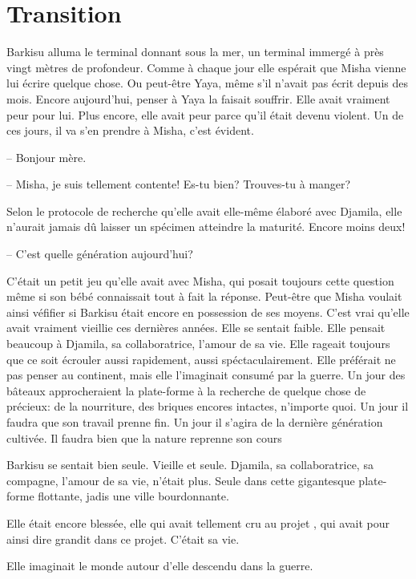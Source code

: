 \chapter{Transition}

Barkisu alluma le terminal donnant sous la mer, un terminal immergé à près
vingt mètres de profondeur. 
%
Comme à chaque jour elle espérait que Misha vienne lui écrire quelque chose.  
%
Ou peut-être Yaya, même s'il n'avait pas écrit depuis des mois.  
% 
Encore aujourd'hui, penser à Yaya la faisait souffrir.  
%
Elle avait vraiment
peur pour lui. 
%
Plus encore, elle avait peur parce qu'il était devenu violent. 
%
Un de ces jours, il va s'en prendre à Misha, c'est évident.

-- Bonjour mère.

-- Misha, je suis tellement contente! Es-tu bien? Trouves-tu à manger?

Selon le protocole de recherche qu'elle avait elle-même élaboré avec Djamila,
elle n'aurait jamais dû laisser un spécimen atteindre la maturité. 
%
Encore moins deux!
%

-- C'est quelle génération aujourd'hui?

C'était un petit jeu qu'elle avait avec Misha, qui posait toujours cette
question même si son bébé connaissait tout à fait la réponse.
%
Peut-être que Misha voulait ainsi véfifier si Barkisu était encore en
possession de ses moyens.
%
C'est vrai qu'elle avait vraiment vieillie ces dernières années. 
%
Elle se sentait faible.
% 
Elle pensait beaucoup à Djamila, sa collaboratrice, l'amour de sa vie.
%
Elle rageait toujours que \nomProjet{} ce soit écrouler aussi rapidement, aussi
spéctaculairement.
%
Elle préférait ne pas penser au continent, mais elle l'imaginait consumé par la
guerre.
%
Un jour des bâteaux approcheraient la plate-forme à la recherche de quelque
chose de précieux: de la nourriture, des briques encores intactes, n'importe
quoi.
%
Un jour il faudra que son travail prenne fin. 
%
Un jour il s'agira de la dernière génération cultivée. 
%
Il faudra bien que la nature reprenne son cours
%


Barkisu se sentait bien seule. Vieille et seule.
Djamila, sa collaboratrice, sa compagne, l'amour de sa vie, n'était plus.
Seule dans cette gigantesque plate-forme flottante, jadis une ville bourdonnante.

Elle était encore blessée, elle qui avait tellement cru au projet \nomProjet{},
qui avait pour ainsi dire grandit dans ce projet. C'était sa vie.

Elle imaginait le monde autour d'elle descendu dans la guerre.

